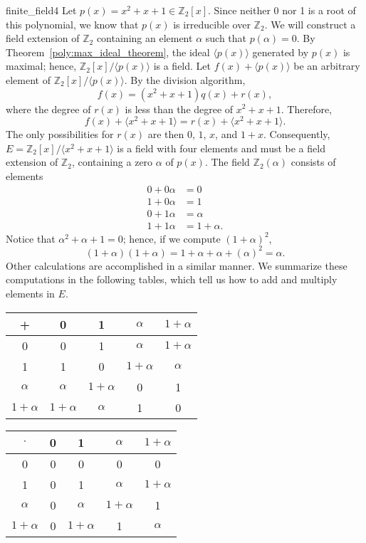 \begin{example}{finite_field4}
Let $p(x) = x^2 + x + 1 \in {\mathbb Z}_2[x]$. Since neither 0 nor 1 is a
root of this polynomial, we know that $p(x)$ is irreducible over
${\mathbb Z}_2$. We will construct a field extension of ${\mathbb Z}_2$
containing an element $\alpha$ such that $p(\alpha) = 0$. By
Theorem~\ref{poly:max_ideal_theorem}, the ideal $\langle p(x) \rangle$ generated by $p(x)$
is maximal; hence, ${\mathbb Z}_2[x] / \langle p(x) \rangle$ is a field. 
Let $f(x) + \langle p(x) \rangle$ be an arbitrary element of
${\mathbb Z}_2[x] / \langle p(x) \rangle$. By the division algorithm,   
\[
f(x) = (x^2 + x + 1) q(x) + r(x),
\]
where the degree of $r(x)$ is less than the degree of $x^2 + x + 1$.
Therefore, 
\[
f(x) + \langle x^2 + x + 1 \rangle = r(x) + \langle x^2 + x + 1
\rangle. 
\]
The only possibilities for $r(x)$ are then $0$, $1$, $x$, and $1+x$.
Consequently, $E = {\mathbb Z}_2[x] / \langle x^2 + x + 1 \rangle$ is a field
with four elements and must be a field extension of ${\mathbb Z}_2$,
containing a zero $\alpha$ of $p(x)$. The field ${\mathbb Z}_2(  \alpha)$
consists of elements  
\begin{align*}
0 + 0 \alpha & = 0 \\
1 + 0 \alpha & = 1 \\
0 + 1 \alpha & = \alpha \\
1 + 1 \alpha & = 1 + \alpha.
\end{align*}
Notice that ${\alpha}^2 + {\alpha} + 1 = 0$; hence, if we compute $(1
+ \alpha)^2$,  
\[
(1 + \alpha)(1 + \alpha)= 1 + \alpha + \alpha + (\alpha)^2 = \alpha. 
\]
Other calculations are accomplished in a similar manner.  We summarize
these computations in the following tables, which tell us how to add
and multiply elements in $E$.
\begin{center}
\begin{tabular}{c|cccc}
+            & 0            & 1            & $\alpha$     & $1 + \alpha$ \\
\hline
0            & 0            & 1            & $\alpha$     & $1 + \alpha$ \\
1            & 1            & 0            & $1 + \alpha$ & $\alpha$ \\
$\alpha$     & $\alpha$     & $1 + \alpha$ & 0            & 1 \\
$1 + \alpha$ & $1 + \alpha$ & $\alpha$     & 1            & 0  
\end{tabular}
\end{center}
\medskip
\begin{center}
\begin{tabular}{c|cccc}
$\cdot$      & 0 & 1             & $\alpha$     & $1 + \alpha$ \\
\hline
0            & 0 & 0             & 0            & 0 \\
1            & 0 & 1             & $\alpha$     & $1 + \alpha$ \\
$\alpha$     & 0 & $\alpha$      & $1 + \alpha$ & 1 \\
$1 + \alpha$ & 0 & $1 + \alpha$  & 1            & $\alpha$
\end{tabular}
\end{center}
\end{example}


